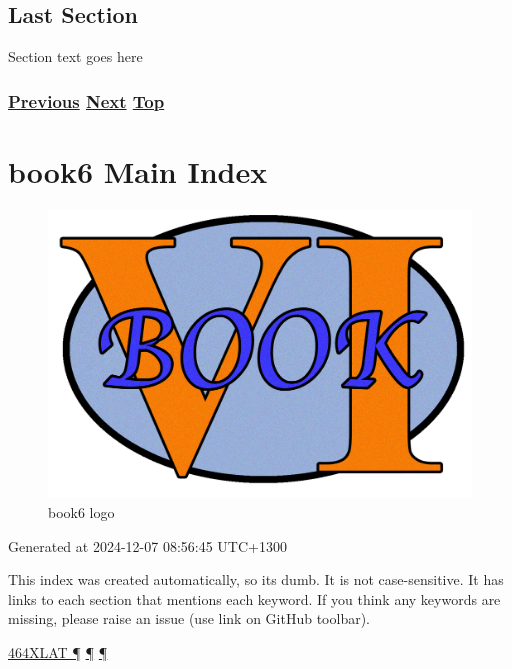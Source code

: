 \documentclass[
]{article}
\begin{document}
\pagebreak

\subsection{Last Section}\label{last-section}

Section text goes here

\subsubsection{\texorpdfstring{\hyperref[markdown-usage]{Previous}
\hyperref[chapter-template]{Next}
\hyperref[chapter-template]{Top}}{Previous Next Top}}\label{previous-next-top-41}

\pagebreak

\section{book6 Main Index}\label{book6-main-index}

\begin{figure}
\centering
\includegraphics{book6logo.png}
\caption{book6 logo}
\end{figure}

Generated at 2024-12-07 08:56:45 UTC+1300

This index was created automatically, so it\textquotesingle s dumb. It
is not case-sensitive. It has links to each section that mentions each
keyword. If you think any keywords are missing, please raise an issue
(use link on GitHub toolbar).

\hyperref[dual-stack-scenarios]{464XLAT ¶}
\hyperref[translation-and-ipv4-as-a-service]{¶}
\hyperref[deployment-by-carriers]{¶}
\end{document}
